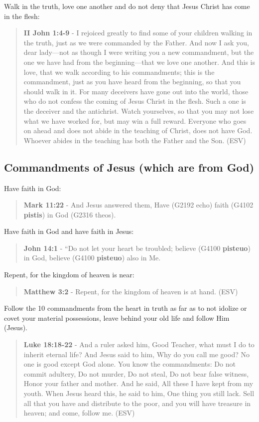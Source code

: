 \documentclass[11pt]{article}
\begin{document}
Walk in the truth, love one another and do not deny that Jesus Christ has come in the flesh:

\begin{quote}
\textbf{II John 1:4-9} - I rejoiced greatly to find some of your children walking in the truth, just as we were commanded by the Father. And now I ask you, dear lady—not as though I were writing you a new commandment, but the one we have had from the beginning—that we love one another. And this is love, that we walk according to his commandments; this is the commandment, just as you have heard from the beginning, so that you should walk in it. For many deceivers have gone out into the world, those who do not confess the coming of Jesus Christ in the flesh. Such a one is the deceiver and the antichrist. Watch yourselves, so that you may not lose what we have worked for, but may win a full reward. Everyone who goes on ahead and does not abide in the teaching of Christ, does not have God. Whoever abides in the teaching has both the Father and the Son. (ESV)
\end{quote}

\subsection{Commandments of Jesus (which are from God)}
\label{sec:org7029939}
Have faith in God:

\begin{quote}
\textbf{Mark 11:22} - And Jesus answered them, Have (G2192 echo) faith (G4102 \textbf{pistis}) in God (G2316 theos).
\end{quote}

Have faith in God and have faith in Jesus:

\begin{quote}
\textbf{John 14:1} - “Do not let your heart be troubled; believe (G4100 \textbf{pisteuo}) in God, believe (G4100 \textbf{pisteuo}) also in Me.
\end{quote}

Repent, for the kingdom of heaven is near:

\begin{quote}
\textbf{Matthew 3:2} - Repent, for the kingdom of heaven is at hand. (ESV)
\end{quote}

Follow the 10 commandments from the heart in truth as far as to not idolize or covet your material possessions, leave behind your old life and follow Him (Jesus). 

\begin{quote}
\textbf{Luke 18:18-22} - And a ruler asked him, Good Teacher, what must I do to inherit eternal life? And Jesus said to him, Why do you call me good? No one is good except God alone. You know the commandments: Do not commit adultery, Do not murder, Do not steal, Do not bear false witness, Honor your father and mother. And he said, All these I have kept from my youth. When Jesus heard this, he said to him, One thing you still lack. Sell all that you have and distribute to the poor, and you will have treasure in heaven; and come, follow me. (ESV)
\end{quote}
\end{document}
